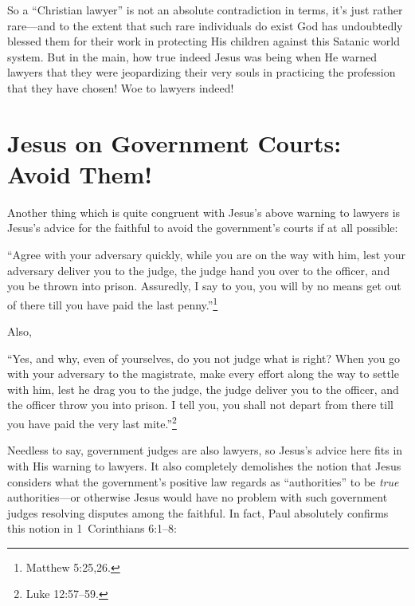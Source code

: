 \documentclass[letterpaper,12pt]{article}
\newenvironment{squote}
  {\small\quote}
  {\endquote\normalsize}
\begin{document}
So a ``Christian lawyer'' is not an absolute contradiction in terms, it's just rather rare---and to the extent that such rare individuals do exist God has undoubtedly blessed them for their work in protecting His children against this Satanic world system. But in the main, how true indeed Jesus was being when He warned lawyers that they were jeopardizing their very souls in practicing the profession that they have chosen! Woe to lawyers indeed!

\section{Jesus on Government Courts: Avoid Them!}
\label{sec:JesusOnGovernmentCourtsAvoidThem}

Another thing which is quite congruent with Jesus's above warning to lawyers is Jesus's advice for the faithful to avoid the government's courts if at all possible:

\begin{squote}
``Agree with your adversary quickly, while you are on the way with him, lest your adversary deliver you to the judge, the judge hand you over to the officer, and you be thrown into prison. Assuredly, I say to you, you will by no means get out of there till you have paid the last penny.''\footnote{Matthew 5:25,26.}
\end{squote}

Also,

\begin{squote}
``Yes, and why, even of yourselves, do you not judge what is right? When you go with your adversary to the magistrate, make every effort along the way to settle with him, lest he drag you to the judge, the judge deliver you to the officer, and the officer throw you into prison. I tell you, you shall not depart from there till you have paid the very last mite.''\footnote{Luke 12:57--59.}
\end{squote}

Needless to say, government judges are also lawyers, so Jesus's advice here fits in with His warning to lawyers. It also completely demolishes the notion that Jesus considers what the government's positive law regards as ``authorities'' to be \emph{true} authorities---or otherwise Jesus would have no problem with such government judges resolving disputes among the faithful. In fact, Paul absolutely confirms this notion in 1~Corinthians 6:1--8:
\end{document}
